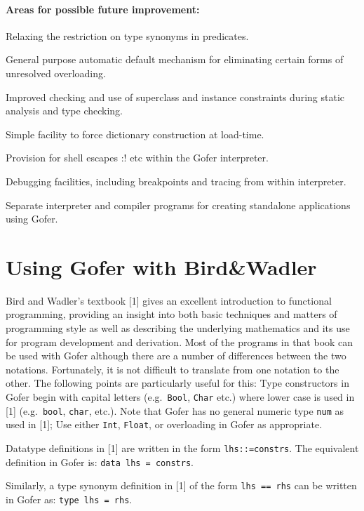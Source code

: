 \subsubsection*{Areas for possible future improvement:}
\BI
\IT  Relaxing the restriction on type synonyms in predicates.

\IT  General  purpose  automatic  default  mechanism  for   eliminating
     certain forms of unresolved overloading.

\IT  Improved checking and use of superclass and  instance  constraints
     during static analysis and type checking.

\IT  Simple facility to force dictionary construction at load-time.

\IT  Provision for shell escapes :! etc within the Gofer interpreter.

\IT  Debugging  facilities,  including  breakpoints  and  tracing  from
     within interpreter.

\IT  Separate interpreter and compiler programs for creating standalone
     applications using Gofer.
\EI



\chapter{Using Gofer with Bird\&Wadler}

Bird and Wadler's textbook  [1]  gives  an  excellent  introduction  to
functional programming, providing an insight into both basic techniques
and matters of programming style as well as describing  the  underlying
mathematics and its use for program development and  derivation.   Most
of the programs in that book can be used with Gofer although there  are
a number of differences between the two notations.  Fortunately, it  is
not difficult to  translate  from  one  notation  to  the  other.   The
following points are particularly useful for this:
\BI
\IT  Type constructors in Gofer  begin with capital letters (e.g.\ \verb"Bool",
     \verb"Char" etc.) where lower case is used in  [1]  
     (e.g.\   \verb"bool",  \verb"char",
     etc.).  Note that Gofer has no general numeric type \verb"num" as used
     in [1];  Use  either  \verb"Int",  \verb"Float",  
     or  overloading  in  Gofer  as
     appropriate.

\IT  Datatype definitions in [1] are written in the form \verb"lhs::=constrs".
     The equivalent definition in Gofer is: \verb"data lhs = constrs".

     Similarly, a type synonym definition in [1] of the form \verb"lhs == rhs"
     can be written in Gofer as: \verb"type lhs = rhs".


